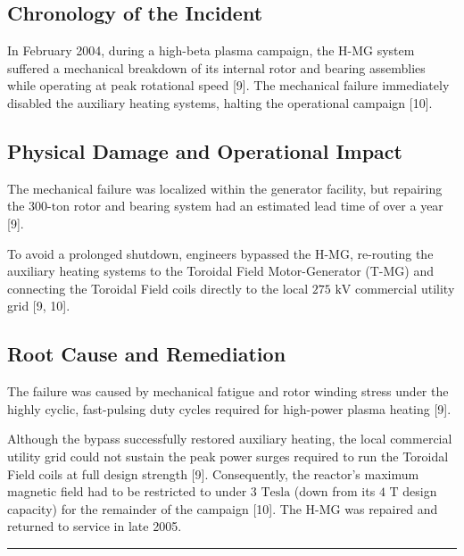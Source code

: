 \documentclass[11pt,a4paper]{article}
\begin{document}
\hypertarget{chronology-of-the-incident-3}{%
\subsection{Chronology of the Incident}\label{chronology-of-the-incident-3}}

In February 2004, during a high-beta plasma campaign, the H-MG system suffered a mechanical breakdown of its internal rotor and bearing assemblies while operating at peak rotational speed {[}9{]}. The mechanical failure immediately disabled the auxiliary heating systems, halting the operational campaign {[}10{]}.

\hypertarget{physical-damage-and-operational-impact-3}{%
\subsection{Physical Damage and Operational Impact}\label{physical-damage-and-operational-impact-3}}

The mechanical failure was localized within the generator facility, but repairing the \(300\text{-ton}\) rotor and bearing system had an estimated lead time of over a year {[}9{]}.

To avoid a prolonged shutdown, engineers bypassed the H-MG, re-routing the auxiliary heating systems to the Toroidal Field Motor-Generator (T-MG) and connecting the Toroidal Field coils directly to the local \(275\text{ kV}\) commercial utility grid {[}9, 10{]}.

\hypertarget{root-cause-and-remediation-3}{%
\subsection{Root Cause and Remediation}\label{root-cause-and-remediation-3}}

The failure was caused by mechanical fatigue and rotor winding stress under the highly cyclic, fast-pulsing duty cycles required for high-power plasma heating {[}9{]}.

Although the bypass successfully restored auxiliary heating, the local commercial utility grid could not sustain the peak power surges required to run the Toroidal Field coils at full design strength {[}9{]}. Consequently, the reactor's maximum magnetic field had to be restricted to under \(3\text{ Tesla}\) (down from its \(4\text{ T}\) design capacity) for the remainder of the campaign {[}10{]}. The H-MG was repaired and returned to service in late 2005.

\begin{center}\rule{0.5\linewidth}{0.5pt}\end{center}
\end{document}
